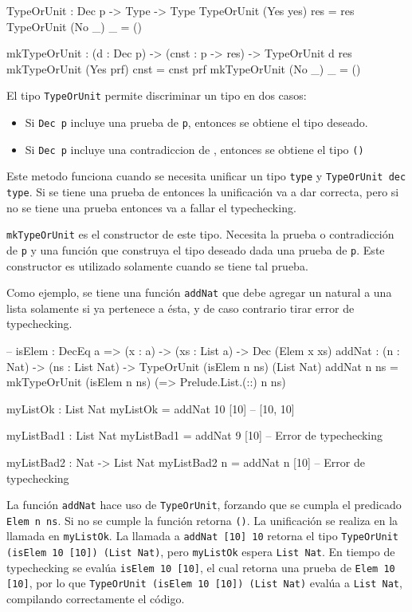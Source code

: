 \begin{code}
TypeOrUnit : Dec p -> Type -> Type
TypeOrUnit (Yes yes) res = res
TypeOrUnit (No _) _ = ()

mkTypeOrUnit : (d : Dec p) -> (cnst : p -> res) -> TypeOrUnit d res
mkTypeOrUnit (Yes prf) cnst = cnst prf
mkTypeOrUnit (No _) _ = ()
\begin{code}

El tipo \texttt{TypeOrUnit} permite discriminar un tipo en dos casos:
\begin{itemize}
\item Si \texttt{Dec p} incluye una prueba de \texttt{p}, entonces se obtiene el tipo deseado.
\item Si \texttt{Dec p} incluye una contradiccion de , entonces se obtiene el tipo \texttt{()}
\end{itemize}

Este metodo funciona cuando se necesita unificar un tipo \texttt{type} y \texttt{TypeOrUnit dec type}. Si se tiene una prueba de  entonces la unificación va a dar correcta, pero si no se tiene una prueba entonces va a fallar el typechecking.

\texttt{mkTypeOrUnit} es el constructor de este tipo. Necesita la prueba o contradicción de \texttt{p} y una función que construya el tipo deseado dada una prueba de \texttt{p}. Este constructor es utilizado solamente cuando se tiene tal prueba.

Como ejemplo, se tiene una función \texttt{addNat} que debe agregar un natural a una lista solamente si ya pertenece a ésta, y de caso contrario tirar error de typechecking.

\begin{code}
-- isElem : DecEq a => (x : a) -> (xs : List a) -> Dec (Elem x xs)
addNat : (n : Nat) -> (ns : List Nat) -> TypeOrUnit (isElem n ns) (List Nat)
addNat n ns = mkTypeOrUnit (isElem n ns) (\isElem => Prelude.List.(::) n ns)

myListOk : List Nat
myListOk = addNat 10 [10] -- [10, 10]

myListBad1 : List Nat
myListBad1 = addNat 9 [10] -- Error de typechecking

myListBad2 : Nat -> List Nat
myListBad2 n = addNat n [10] -- Error de typechecking
\end{code}

La función \texttt{addNat} hace uso de \texttt{TypeOrUnit}, forzando que se cumpla el predicado \texttt{Elem n ns}. Si no se cumple la función retorna \texttt{()}. La unificación se realiza en la llamada en \texttt{myListOk}. La llamada a \texttt{addNat [10] 10} retorna el tipo \texttt{TypeOrUnit (isElem 10 [10]) (List Nat)}, pero \texttt{myListOk} espera \texttt{List Nat}. En tiempo de typechecking se evalúa \texttt{isElem 10 [10]}, el cual retorna una prueba de \texttt{Elem 10 [10]}, por lo que \texttt{TypeOrUnit (isElem 10 [10]) (List Nat)} evalúa a \texttt{List Nat}, compilando correctamente el código.


\end{code}
\end{code}

